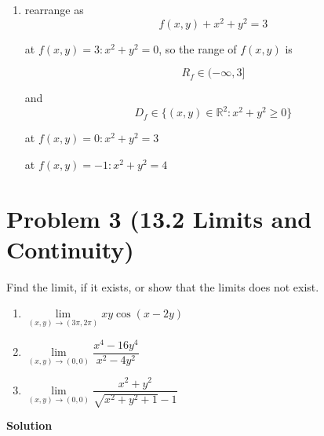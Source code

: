 \documentclass{article}
\newcommand{\solution}{\textbf{\large Solution}}
\theoremstyle{remark}
\begin{document}
\begin{enumerate}[label=(\alph*)]
    \item rearrange as
    \[
    f(x,y)+x^2+y^2=3
    \]

    at $f(x,y)=3 : x^2+y^2=0$, so the range of $f(x,y)$ is 

    \[
    \boxed{R_f \in (-\infty,3]}
    \]

    and \[
    \boxed{D_f \in \{(x,y)\in \mathbb{R}^2 : x^2+y^2 \ge 0\}}
    \]

    at $f(x,y)=0 : x^2+y^2=3$

    at $f(x,y)=-1 : x^2+y^2=4$

    \begin{center}
    \end{center}
\end{enumerate}

\vspace{1em}
\hrulefill

\section*{Problem 3 (13.2 Limits and Continuity)}
Find the limit, if it exists, or show that the limits does not exist.
\begin{enumerate}[label=(\alph*)]
    \item $\lim\limits_{(x,y)\to(3\pi,2\pi)} xy\cos(x-2y)$
    \item $\lim\limits_{(x,y)\to(0,0)} \dfrac{x^4-16y^4}{x^2-4y^2}$
    \item $\lim\limits_{(x,y)\to(0,0)} \dfrac{x^2+y^2}{\sqrt{x^2+y^2+1}-1}$
\end{enumerate}

\medskip
\solution
\end{document}
